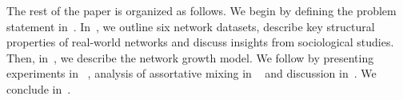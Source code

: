 The rest of the paper is organized as follows.
We begin by defining the problem statement in~.
In~, we outline six network datasets, describe key structural
properties of real-world networks and discuss insights from sociological studies.
Then, in~, we describe the network growth model. We follow
by presenting experiments in ~, analysis of assortative mixing
in ~ and discussion in~.
We conclude in~.


